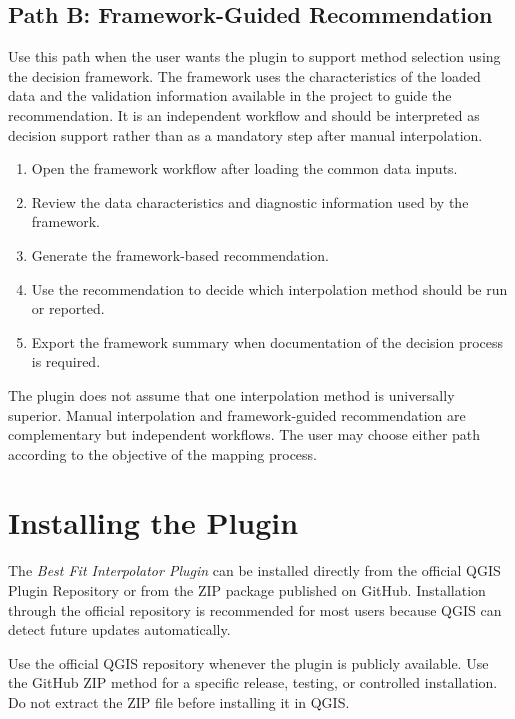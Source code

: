 \documentclass[11pt,a4paper]{article}
\begin{document}
\subsection{Path B: Framework-Guided Recommendation}


Use this path when the user wants the plugin to support method selection using the decision framework. The framework uses the characteristics of the loaded data and the validation information available in the project to guide the recommendation. It is an independent workflow and should be interpreted as decision support rather than as a mandatory step after manual interpolation.


\begin{enumerate}
    \item Open the framework workflow after loading the common data inputs.
    \item Review the data characteristics and diagnostic information used by the framework.
    \item Generate the framework-based recommendation.
    \item Use the recommendation to decide which interpolation method should be run or reported.
    \item Export the framework summary when documentation of the decision process is required.
\end{enumerate}


\begin{infobox}
The plugin does not assume that one interpolation method is universally superior. Manual interpolation and framework-guided recommendation are complementary but independent workflows. The user may choose either path according to the objective of the mapping process.
\end{infobox}


\section{Installing the Plugin}

The \textit{Best Fit Interpolator Plugin} can be installed directly from the official QGIS Plugin Repository or from the ZIP package published on GitHub. Installation through the official repository is recommended for most users because QGIS can detect future updates automatically.

\begin{infobox}
Use the official QGIS repository whenever the plugin is publicly available. Use the GitHub ZIP method for a specific release, testing, or controlled installation. Do not extract the ZIP file before installing it in QGIS.
\end{infobox}
\end{document}
